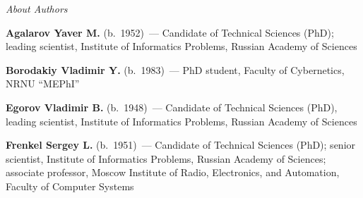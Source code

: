 
\begin{center}\LARGE
\textit{About Authors}
\end{center}
\thispagestyle{empty}

\vspace*{24pt}


\begin{multicols}{2}

\noindent
\textbf{Agalarov Yaver M.} (b.\ 1952)~--- Candidate of Technical Sciences (PhD); 
leading scientist,
Institute of Informatics
Problems, Russian Academy of Sciences



\vspace*{6pt}

\noindent
\textbf{Borodakiy Vladimir Y.} (b.\ 1983)~--- PhD student, Faculty of Cybernetics,
NRNU ``MEPhI''


\vspace*{3pt}




\noindent %
\textbf{Egorov Vladimir B.} (b.\ 1948)~--- Candidate of Technical Sciences (PhD),
leading scientist,
Institute of Informatics Problems, Russian Academy of Sciences

\vspace*{3pt}

\noindent
\textbf{Frenkel Sergey L.} (b.\ 1951)~--- Candidate of Technical Sciences (PhD);
senior scientist, Institute of Informatics Problems,
Russian Academy of Sciences; associate professor, Moscow Institute of
Radio, Electronics, and Automation, Faculty of Computer Systems

\vspace*{3pt}


\end{multicols}
